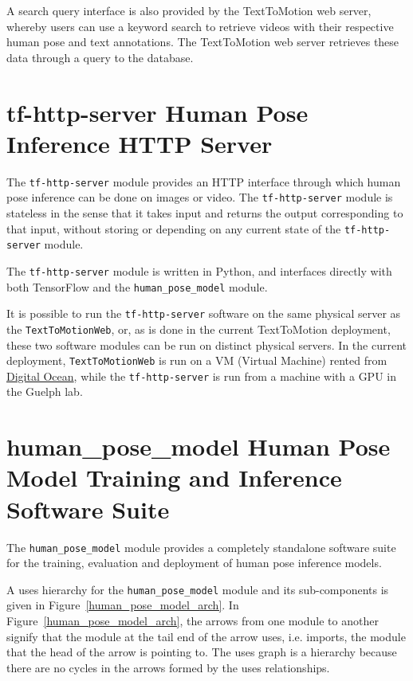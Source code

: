 \documentclass{scrreprt}
\begin{document}
A search query interface is also provided by the TextToMotion web server,
whereby users can use a keyword search to retrieve videos with their respective
human pose and text annotations. The TextToMotion web server retrieves these
data through a query to the database.

\section{tf-http-server Human Pose Inference HTTP Server}

The \verb|tf-http-server| module provides an HTTP interface through which
human pose inference can be done on images or video. The \verb|tf-http-server|
module is stateless in the sense that it takes input and returns the output
corresponding to that input, without storing or depending on any current state
of the \verb|tf-http-server| module.

The \verb|tf-http-server| module is written in Python, and interfaces directly
with both TensorFlow and the \verb|human_pose_model| module.

It is possible to run the \verb|tf-http-server| software on the same physical
server as the \verb|TextToMotionWeb|, or, as is done in the current
TextToMotion deployment, these two software modules can be run on distinct
physical servers. In the current deployment, \verb|TextToMotionWeb| is run on a
VM (Virtual Machine) rented from
\href{https://digitalocean.com}{Digital Ocean}, while the \verb|tf-http-server|
is run from a machine with a GPU in the Guelph lab.

\section{human\_pose\_model Human Pose Model Training and Inference
         Software Suite}

The \verb|human_pose_model| module provides a completely standalone software
suite for the training, evaluation and deployment of human pose inference
models.

A uses hierarchy for the \verb|human_pose_model| module and its sub-components
is given in Figure~\ref{human_pose_model_arch}. In
Figure~\ref{human_pose_model_arch}, the arrows from one module to another
signify that the module at the tail end of the arrow uses, i.e. imports, the
module that the head of the arrow is pointing to. The uses graph is a hierarchy
because there are no cycles in the arrows formed by the uses relationships.
\end{document}
